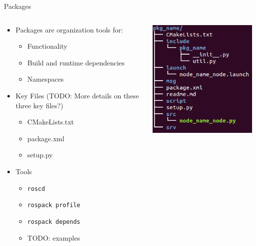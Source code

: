 \documentclass[aspectratio=43]{beamer}
\begin{document}
\begin{frame}{Packages}
\begin{columns}
	\begin{column}{0.6\textwidth}
		\begin{itemize}
			\item Packages are organization tools for:
			\begin{itemize}
				\item Functionality
				\item Build and runtime dependencies
				\item Namespaces
			\end{itemize}
			\item Key Files (TODO: More details on these three key files?)
				\begin{itemize}
					\item CMakeLists.txt
					\item package.xml
					\item setup.py
				\end{itemize}
			\item Tools
				\begin{itemize}
					\item \texttt{roscd}
					\item \texttt{rospack profile}
					\item \texttt{rospack depends}
					\item TODO: examples
				\end{itemize}
		\end{itemize}
	\end{column}
	\begin{column}{0.4\textwidth}
		\centering
		\includegraphics[width=\textwidth]{fig/pkg_tree.png}
	\end{column}
\end{columns}
\end{frame}
\end{document}
